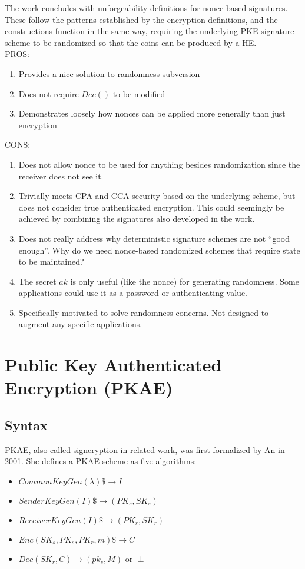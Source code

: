 \documentclass[11pt, pdftex]{article}
\begin{document}
The work concludes with unforgeability definitions for nonce-based signatures.  These follow the patterns established by the encryption
definitions, and the constructions function in the same way, requiring the underlying PKE signature scheme to be randomized so
that the coins can be produced by a HE.\\

\noindent PROS:
\begin{enumerate}
\item Provides a nice solution to randomness subversion
\item Does not require $Dec()$ to be modified
\item Demonstrates loosely how nonces can be applied more generally than just encryption
\end{enumerate}

\noindent CONS:
\begin{enumerate}
\item Does not allow nonce to be used for anything besides randomization since the receiver does not see it.
\item Trivially meets CPA and CCA security based on the underlying scheme, but does not consider true authenticated encryption.
This could seemingly be achieved by combining the signatures also developed in the work.
\item Does not really address why deterministic signature schemes are not ``good enough''.  Why do we need nonce-based randomized schemes
that require state to be maintained?
\item The secret $ak$ is only useful (like the nonce) for generating randomness.  Some applications could use it as a password or
authenticating value.
\item Specifically motivated to solve randomness concerns.  Not designed to augment any specific applications.
\end{enumerate}

\section{Public Key Authenticated Encryption (PKAE)}

\subsection{Syntax}
PKAE, also called signcryption in related work, was first formalized by An in 2001.  She defines a PKAE scheme as five algorithms:
\begin{itemize}
\item $CommonKeyGen(\lambda) \$\rightarrow I$
\item $SenderKeyGen(I) \$\rightarrow (PK_s, SK_s)$
\item $ReceiverKeyGen(I) \$\rightarrow (PK_r, SK_r)$
\item $Enc(SK_s, PK_s, PK_r, m) \$\rightarrow C$
\item $Dec(SK_r, C) \rightarrow (pk_s, M) \text{ or } \perp$
\end{itemize}
\end{document}
